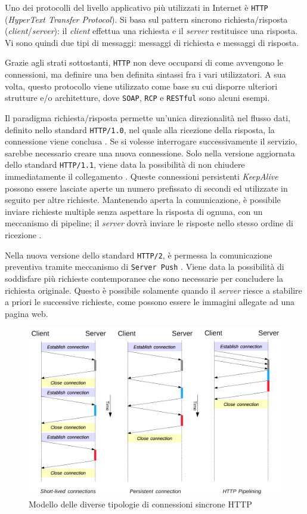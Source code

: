 Uno dei protocolli del livello applicativo più utilizzati in Internet è \verb+HTTP+ (\textit{HyperText Transfer Protocol}).
Si basa sul pattern sincrono richiesta/risposta (\textit{client}/\textit{server}): il \textit{client} effettua una richiesta e il \textit{server} restituisce una risposta.
Vi sono quindi due tipi di messaggi: messaggi di richiesta e messaggi di risposta.

Grazie agli strati sottostanti, \verb+HTTP+ non deve occuparsi di come avvengono le connessioni, ma definire una ben definita sintassi fra i vari utilizzatori.
A sua volta, questo protocollo viene utilizzato come base su cui disporre ulteriori strutture e/o architetture, dove \verb+SOAP+, \verb+RCP+ e \verb+RESTful+ sono alcuni esempi.

Il paradigma richiesta/risposta permette un'unica direzionalità nel flusso dati, definito nello standard \verb+HTTP/1.0+, nel quale alla ricezione della risposta, la connessione viene conclusa \cite{Rfc1945}.
Se si volesse interrogare successivamente il servizio, sarebbe necessario creare una nuova connessione.
Solo nella versione aggiornata dello standard \verb+HTTP/1.1+, viene data la possibilità di non chiudere immediatamente il collegamento \cite{Rfc2068}.
Queste connessioni persistenti \textit{KeepAlive} possono essere lasciate aperte un numero prefissato di secondi ed utilizzate in seguito per altre richieste.
Mantenendo aperta la comunicazione, è possibile inviare richieste multiple senza aspettare la risposta di ognuna, con un meccanismo di pipeline; il \textit{server} dovrà inviare le risposte nello stesso ordine di ricezione \cite{Rfc7230}.

Nella nuova versione dello standard \verb+HTTP/2+, è permessa la comunicazione preventiva tramite meccanismo di \verb+Server Push+ \cite{Rfc7540}.
Viene data la possibilità di soddisfare più richieste contemporanee che sono necessarie per concludere la richiesta originale.
Questo è possibile solamente quando il \textit{server} riesce a stabilire a priori le successive richieste, come possono essere le immagini allegate ad una pagina web.

\begin{figure}[H]
  \centering
  \includegraphics[width=0.95\linewidth, keepaspectratio]{http}
  \caption{Modello delle diverse tipologie di connessioni sincrone HTTP}
  \label{fig:http}
\end{figure}

